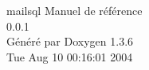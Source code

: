 \documentclass[a4paper]{book}
\begin{document}
\begin{titlepage}
\vspace*{7cm}
\begin{center}
{\Large mailsql Manuel de r\'{e}f\'{e}rence\\[1ex]\large 0.0.1 }\\
\vspace*{1cm}
{\large G\'{e}n\'{e}r\'{e} par Doxygen 1.3.6}\\
\vspace*{0.5cm}
{\small Tue Aug 10 00:16:01 2004}\\
\end{center}
\end{titlepage}
\clearemptydoublepage
{}
\tableofcontents
\clearemptydoublepage
{}
\printindex
\end{document}
